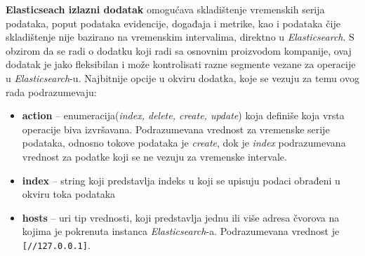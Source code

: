 \par
\textbf{Elasticseach izlazni dodatak} \cite{elasticsearch-plugin} omogućava skladištenje vremenskih serija podataka, poput podataka evidencije, događaja i metrike, kao i podataka čije skladištenje nije bazirano na vremenskim intervalima, direktno u \textit{Elasticsearch}. S obzirom da se radi o dodatku koji radi sa osnovnim proizvodom kompanije, ovaj dodatak je jako fleksibilan i može kontrolisati razne segmente vezane za operacije u \textit{Elasticsearch}-u. Najbitnije opcije u okviru dodatka, koje se vezuju za temu ovog rada podrazumevaju:
\begin{itemize}
    \item \textbf{action} – enumeracija(\textit{index, delete, create, update}) koja definiše koja vrsta operacije biva izvršavana. Podrazumevana vrednost za vremenske serije podataka, odnosno tokove podataka je \textit{create}, dok je \textit{index} podrazumevana vrednost za podatke koji se ne vezuju za vremenske intervale.
    \item \textbf{index} – string koji predstavlja indeks u koji se upisuju podaci obrađeni u okviru toka podataka
    \item \textbf{hosts} – uri tip vrednosti, koji predstavlja jednu ili više adresa čvorova na kojima je pokrenuta instanca \textit{Elasticsearch}-a. Podrazumevana vrednost je \texttt{[//127.0.0.1]}.
\end{itemize}